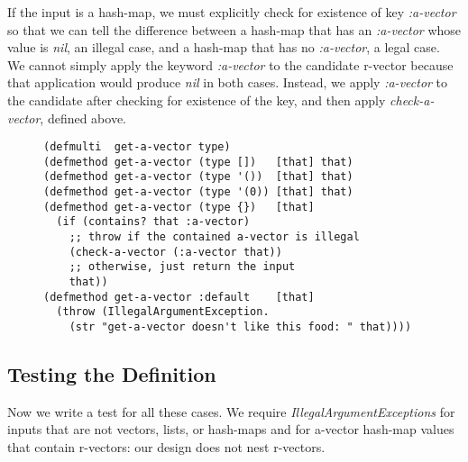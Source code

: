 \documentclass[11pt]{article}
\begin{document}
If the input is a hash-map, we must explicitly check for existence of
key \emph{\mbox{:a-vector}} so that we can tell the difference between a
hash-map that has an \emph{\mbox{:a-vector}} whose value is \emph{nil}, an
illegal case, and a hash-map that has no \emph{\mbox{:a-vector}}, a legal
case. We cannot simply apply the keyword \emph{\mbox{:a-vector}} to the
candidate r-vector because that application would produce \emph{nil} in
both cases. Instead, we apply \emph{\mbox{:a-vector}} to the candidate
after checking for existence of the key, and then apply
\emph{check-a-vector}, defined above.

\begin{figure}[H]
\label{get-a-vector-helper}
\begin{verbatim}
(defmulti  get-a-vector type)
(defmethod get-a-vector (type [])   [that] that)
(defmethod get-a-vector (type '())  [that] that)
(defmethod get-a-vector (type '(0)) [that] that)
(defmethod get-a-vector (type {})   [that]
  (if (contains? that :a-vector)
    ;; throw if the contained a-vector is illegal
    (check-a-vector (:a-vector that))
    ;; otherwise, just return the input
    that))
(defmethod get-a-vector :default    [that]
  (throw (IllegalArgumentException.
    (str "get-a-vector doesn't like this food: " that))))
\end{verbatim}
\end{figure}
\subsection{Testing the Definition}
\label{sec-4-3}

Now we write a test for all these cases. We require
\emph{IllegalArgumentExceptions} for inputs that are not vectors, lists,
or hash-maps and for a-vector hash-map values that contain r-vectors:
our design does not nest r-vectors.
\end{document}

